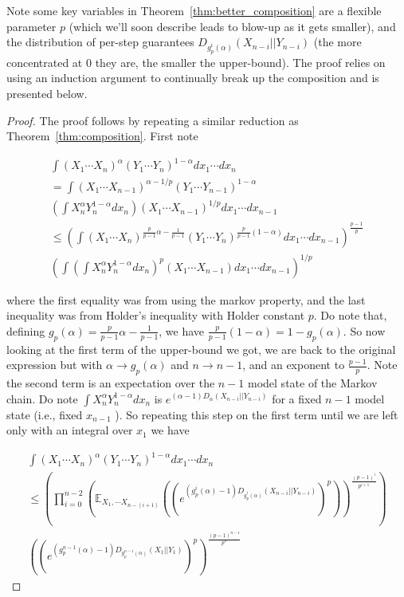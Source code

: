 Note some key variables in Theorem~\ref{thm:better_composition} are a flexible parameter $p$ (which we'll soon describe leads to blow-up as it gets smaller), and the distribution of per-step guarantees $D_{g_p^{i}(\alpha)}(X_{n-i}|| Y_{n-i})$ (the more concentrated at $0$ they are, the smaller the upper-bound). The proof relies on using an induction argument to continually break up the composition and is presented below.

\begin{proof}


The proof follows by repeating a similar reduction as Theorem~\ref{thm:composition}. First note 
    
\begin{multline}
    \int (X_1 \cdots X_n)^{\alpha} (Y_1 \cdots Y_n)^{1 - \alpha} dx_1 \cdots dx_n \\  = \int (X_1 \cdots X_{n-1})^{\alpha - 1/p} (Y_1 \cdots Y_{n-1})^{1 - \alpha}  \\ (\int X_n^{\alpha} Y_n^{1- \alpha} dx_n) (X_1 \cdots X_{n-1})^{1/p} dx_1 \cdots dx_{n-1}
    \\ \leq ( \int (X_1 \cdots X_n)^{\frac{p}{p-1}\alpha - \frac{1}{p-1}} (Y_1 \cdots Y_n)^{ \frac{p}{p-1}(1 - \alpha)}  dx_1 \cdots dx_{n-1})^{\frac{p-1}{p}} \\ (\int (\int X_n^{\alpha} Y_n^{1- \alpha} dx_n)^p (X_1 \cdots X_{n-1}) dx_1 \cdots dx_{n-1})^{1/p} 
\end{multline}

where the first equality was from using the markov property, and the last inequality was from Holder's inequality with Holder constant $p$. Do note that, defining $g_p(\alpha) = \frac{p}{p-1}\alpha - \frac{1}{p-1}$, we have $\frac{p}{p-1}(1 - \alpha) = 1 - g_p(\alpha)$. So now looking at the first term of the upper-bound we got, we are back to the original expression but with $\alpha \rightarrow g_p(\alpha)$ and $n \rightarrow n-1$, and an exponent to $\frac{p-1}{p}$. Note the second term is an expectation over the $n-1$ model state of the Markov chain. Do note $\int X_n^{\alpha} Y_n^{1- \alpha} dx_n$ is $e^{(\alpha -1)D_{\alpha}(X_{n-i}|| Y_{n-i})}$ for a fixed $n-1$ model state (i.e., fixed $x_{n-1}$ ). So repeating this step on the first term until we are left only with an integral over $x_1$ we have

\begin{multline}
    \int (X_1 \cdots X_n)^{\alpha} (Y_1 \cdots Y_n)^{1 - \alpha} dx_1 \cdots dx_n \\  
    \leq (\prod_{i=0}^{n-2} (\mathbb{E}_{X_1,\cdots X_{n-(i+1)}}  ((e^{(g_p^{i}(\alpha) -1)D_{g_p^{i}(\alpha)}(X_{n-i}|| Y_{n-i})})^p))^{\frac{(p-1)^i}{p^{i+1}}}) \\ ( (e^{(g_p^{n-1}(\alpha) -1)D_{g_p^{n-1}(\alpha)}(X_{1}|| Y_{1})})^p)^{\frac{(p-1)^{n-1}}{p^n}}
\end{multline}


\end{proof}
